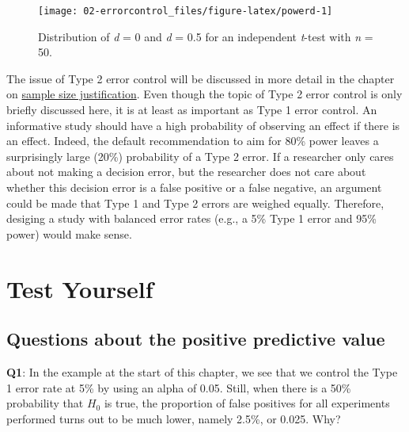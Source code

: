 \documentclass[
  oneside]{krantz}
\begin{document}
\begin{figure}

{\centering \texttt{[image: 02-errorcontrol\_files/figure-latex/powerd-1]} 

}

\caption{Distribution of \emph{d} = 0 and \emph{d} = 0.5 for an independent \emph{t}-test with \emph{n} = 50.}\label{fig:powerd}
\end{figure}

The issue of Type 2 error control will be discussed in more detail in the chapter on \protect\hyperlink{aprioripower}{sample size justification}. Even though the topic of Type 2 error control is only briefly discussed here, it is at least as important as Type 1 error control. An informative study should have a high probability of observing an effect if there is an effect. Indeed, the default recommendation to aim for 80\% power leaves a surprisingly large (20\%) probability of a Type 2 error. If a researcher only cares about not making a decision error, but the researcher does not care about whether this decision error is a false positive or a false negative, an argument could be made that Type 1 and Type 2 errors are weighed equally. Therefore, desiging a study with balanced error rates (e.g., a 5\% Type 1 error and 95\% power) would make sense.

\hypertarget{test-yourself-1}{%
\section{Test Yourself}\label{test-yourself-1}}

\hypertarget{questions-about-the-positive-predictive-value}{%
\subsection{Questions about the positive predictive value}\label{questions-about-the-positive-predictive-value}}

\textbf{Q1}: In the example at the start of this chapter, we see that we control the Type 1 error rate at 5\% by using an alpha of 0.05. Still, when there is a 50\% probability that \(H_0\) is true, the proportion of false positives for all experiments performed turns out to be much lower, namely 2.5\%, or 0.025. Why?
\end{document}
